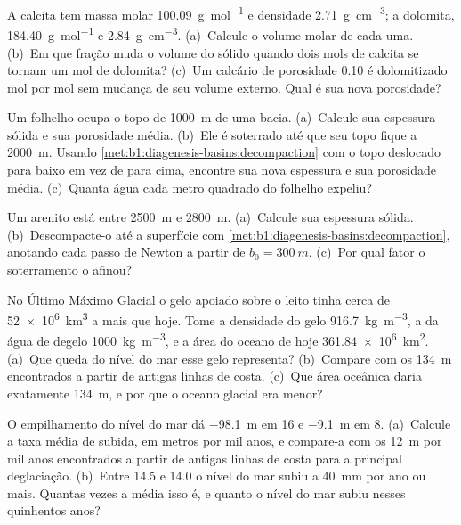 \begin{exercise}[$\star$]\label{exo:b1:diagenesis-basins:4}
A calcita tem massa molar \qty{100.09}{g.mol^{-1}} e densidade \qty{2.71}{g.cm^{-3}}; a
dolomita, \qty{184.40}{g.mol^{-1}} e \qty{2.84}{g.cm^{-3}}. (a)~Calcule o volume molar de cada
uma. (b)~Em que fração muda o volume do sólido quando dois mols de calcita se tornam um mol de
dolomita? (c)~Um calcário de porosidade \num{0.10} é dolomitizado mol por mol sem mudança de
seu volume externo. Qual é sua nova porosidade?
\end{exercise}

\begin{exercise}[$\star\star$]\label{exo:b1:diagenesis-basins:5}
Um folhelho ocupa o topo de \qty{1000}{m} de uma bacia. (a)~Calcule sua espessura sólida e sua
porosidade média. (b)~Ele é soterrado até que seu topo fique a \qty{2000}{m}. Usando
\cref{met:b1:diagenesis-basins:decompaction} com o topo deslocado para baixo em vez de para
cima, encontre sua nova espessura e sua porosidade média. (c)~Quanta água cada metro quadrado
do folhelho expeliu?
\end{exercise}

\begin{exercise}[$\star\star$]\label{exo:b1:diagenesis-basins:6}
Um arenito está entre \qty{2500}{m} e \qty{2800}{m}. (a)~Calcule sua espessura sólida.
(b)~Descompacte-o até a superfície com \cref{met:b1:diagenesis-basins:decompaction},
anotando cada passo de Newton a partir de $b_0 = \qty{300}{m}$. (c)~Por qual fator o
soterramento o afinou?
\end{exercise}

\begin{exercise}[$\star\star$]\label{exo:b1:diagenesis-basins:7}
No Último Máximo Glacial o gelo apoiado sobre o leito tinha cerca de \qty{52e6}{km^3} a mais
que hoje. Tome a densidade do gelo \qty{916.7}{kg.m^{-3}}, a da água de degelo
\qty{1000}{kg.m^{-3}}, e a área do oceano de hoje \qty{361.84e6}{km^2}. (a)~Que queda do nível
do mar esse gelo representa? (b)~Compare com os \qty{134}{m} encontrados a partir de antigas
linhas de costa. (c)~Que área oceânica daria exatamente \qty{134}{m}, e por que o oceano
glacial era menor?
\end{exercise}

\begin{exercise}[$\star\star$]\label{exo:b1:diagenesis-basins:8}
O empilhamento do nível do mar dá \qty{-98.1}{m} em \qty{16}{\ka} e \qty{-9.1}{m} em
\qty{8}{\ka}. (a)~Calcule a taxa média de subida, em metros por mil anos, e compare-a com os
\qty{12}{m} por mil anos encontrados a partir de antigas linhas de costa para a principal
deglaciação. (b)~Entre \qty{14.5}{\ka} e \qty{14.0}{\ka} o nível do mar subiu a \qty{40}{mm}
por ano ou mais. Quantas vezes a média isso é, e quanto o nível do mar subiu nesses quinhentos
anos?
\end{exercise}

